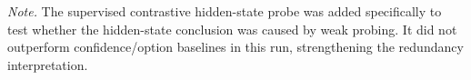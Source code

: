 \begin{table}[t]
\centering
\small
\caption{Stronger hidden-state probe sensitivity on Gemma-2-9B-IT and Llama-3.1-8B-Instruct.}
\label{tab:contrastive}
%

\par\smallskip
\begin{minipage}{0.96\linewidth}\footnotesize\textit{Note.} The supervised contrastive hidden-state probe was added specifically to test whether the hidden-state conclusion was caused by weak probing. It did not outperform confidence/option baselines in this run, strengthening the redundancy interpretation.\end{minipage}
\end{table}
